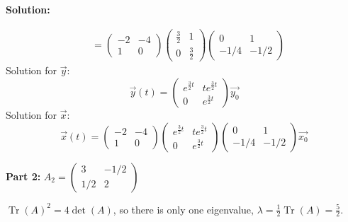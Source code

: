 \documentclass[12pt]{article}
\DeclareMathOperator{\Tr}{Tr}
\newenvironment{solution}{
    \textbf{Solution:}
    
}{
    
    \vspace{2em}
}
\begin{document}
\begin{solution}
\[\begin{aligned}
            &= \begin{pmatrix}
                -2 & -4 \\
                1 & 0
            \end{pmatrix} \begin{pmatrix}
                \frac{3}{2} & 1 \\
                0 & \frac{3}{2}
            \end{pmatrix} \begin{pmatrix}
                0 & 1 \\
                -1/4 & -1/2
            \end{pmatrix}
        \end{aligned}
    \]
    Solution for \(\vec{y}\):
    \[
        \vec{y}(t) = \begin{pmatrix}
            e^{\frac{3}{2}t} & te^{\frac{3}{2}t} \\
            0 & e^{\frac{3}{2}t}
        \end{pmatrix} \vec{y_0}
    \]
    Solution for \(\vec{x}\):
    \[
        \vec{x}(t) = \begin{pmatrix}
            -2 & -4 \\
            1 & 0
        \end{pmatrix} \begin{pmatrix}
            e^{\frac{3}{2}t} & te^{\frac{3}{2}t} \\
            0 & e^{\frac{3}{2}t}
        \end{pmatrix} \begin{pmatrix}
            0 & 1 \\
            -1/4 & -1/2
        \end{pmatrix} \vec{x_0}
    \]
    
    

    \textbf{Part 2:} \(A_2 = \begin{pmatrix}
        3 & -1/2 \\
        1/2 & 2
    \end{pmatrix}\)

    \(\Tr(A)^2 = 4\det(A)\), so there is only one eigenvalue, \(\lambda = \frac{1}{2}\Tr(A) = \frac{5}{2}\).


\end{solution}
\end{document}
